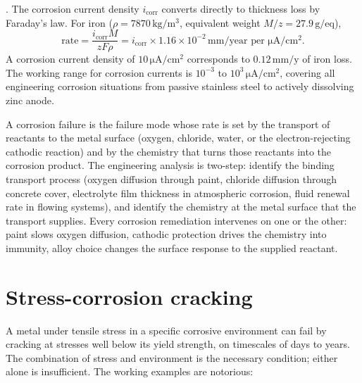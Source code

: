 . The corrosion current density
$i_{\text{corr}}$ converts directly to thickness loss by Faraday's
law. For iron ($\rho = 7870\,\text{kg}/\text{m}^3$, equivalent weight
$M/z = 27.9\,\text{g}/\text{eq}$),
\[
\text{rate} = \frac{i_{\text{corr}} M}{z F \rho} = i_{\text{corr}} \times
1.16 \times 10^{-2}\,\text{mm/year per }\si{\micro\ampere\per\centi\meter\squared}.
\]
A corrosion current density of $10\,\si{\micro\ampere\per\centi\meter\squared}$
corresponds to $0.12\,\text{mm}/\text{y}$ of iron loss. The working
range for corrosion currents is $10^{-3}$ to $10^3\,\si{\micro\ampere\per\centi\meter\squared}$,
covering all engineering corrosion situations from passive stainless
steel to actively dissolving zinc anode.

\begin{archetype}
A corrosion failure is the failure mode whose rate is set by the
transport of reactants to the metal surface (oxygen, chloride, water,
or the electron-rejecting cathodic reaction) and by the chemistry that
turns those reactants into the corrosion product. The engineering
analysis is two-step: identify the binding transport process (oxygen
diffusion through paint, chloride diffusion through concrete cover,
electrolyte film thickness in atmospheric corrosion, fluid renewal
rate in flowing systems), and identify the chemistry at the metal
surface that the transport supplies. Every corrosion remediation
intervenes on one or the other: paint slows oxygen diffusion, cathodic
protection drives the chemistry into immunity, alloy choice changes
the surface response to the supplied reactant.
\end{archetype}

\section{Stress-corrosion cracking}

A metal under tensile stress in a specific corrosive environment can
fail by cracking at stresses well below its yield strength, on
timescales of days to years. The combination of stress and environment
is the necessary condition; either alone is insufficient. The working
examples are notorious:

